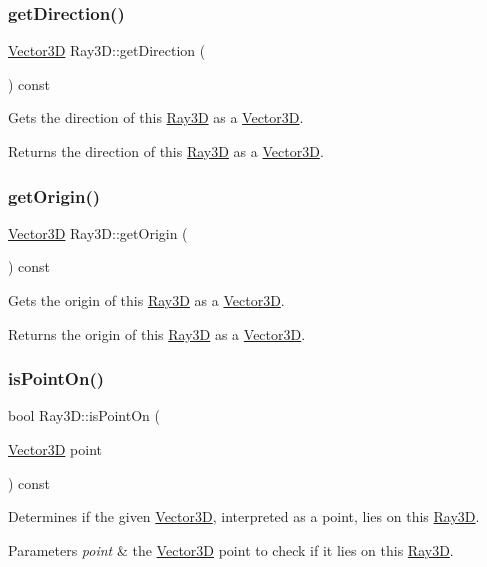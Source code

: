 \subsubsection{\texorpdfstring{get\+Direction()}{getDirection()}}
{\footnotesize\ttfamily \hyperlink{classVector3D}{Vector3D} Ray3\+D\+::get\+Direction (\begin{DoxyParamCaption}{ }\end{DoxyParamCaption}) const}

Gets the direction of this \hyperlink{classRay3D}{Ray3D} as a \hyperlink{classVector3D}{Vector3D}. \begin{DoxyReturn}{Returns}
the direction of this \hyperlink{classRay3D}{Ray3D} as a \hyperlink{classVector3D}{Vector3D}. 
\end{DoxyReturn}
\mbox{\label{classRay3D_a502f164e4686e935b2da62ecfc3c1763}} 
\subsubsection{\texorpdfstring{get\+Origin()}{getOrigin()}}
{\footnotesize\ttfamily \hyperlink{classVector3D}{Vector3D} Ray3\+D\+::get\+Origin (\begin{DoxyParamCaption}{ }\end{DoxyParamCaption}) const}

Gets the origin of this \hyperlink{classRay3D}{Ray3D} as a \hyperlink{classVector3D}{Vector3D}. \begin{DoxyReturn}{Returns}
the origin of this \hyperlink{classRay3D}{Ray3D} as a \hyperlink{classVector3D}{Vector3D}. 
\end{DoxyReturn}
\mbox{\label{classRay3D_a3d2192f11ca0607eab71e66551cc9288}} 
\subsubsection{\texorpdfstring{is\+Point\+On()}{isPointOn()}}
{\footnotesize\ttfamily bool Ray3\+D\+::is\+Point\+On (\begin{DoxyParamCaption}\item[{\hyperlink{classVector3D}{Vector3D}}]{point }\end{DoxyParamCaption}) const}

Determines if the given \hyperlink{classVector3D}{Vector3D}, interpreted as a point, lies on this \hyperlink{classRay3D}{Ray3D}. 
\begin{DoxyParams}{Parameters}
{\em point} & the \hyperlink{classVector3D}{Vector3D} point to check if it lies on this \hyperlink{classRay3D}{Ray3D}. \\
\hline
\end{DoxyParams}
\mbox{\label{classRay3D_a3cb1d7b99c881a9fc059ef125232bb3b}} 
